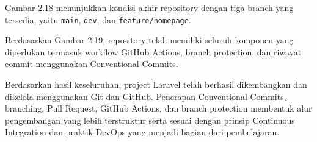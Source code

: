 \documentclass[a4paper,oneside,11pt]{book}
\begin{document}

Gambar 2.18 menunjukkan kondisi akhir repository dengan tiga branch yang tersedia, yaitu \texttt{main}, \texttt{dev}, dan \texttt{feature/homepage}.


Berdasarkan Gambar 2.19, repository telah memiliki seluruh komponen yang diperlukan termasuk workflow GitHub Actions, branch protection, dan riwayat commit menggunakan Conventional Commits.

Berdasarkan hasil keseluruhan, project Laravel telah berhasil dikembangkan dan dikelola menggunakan Git dan GitHub. Penerapan Conventional Commits, branching, Pull Request, GitHub Actions, dan branch protection membentuk alur pengembangan yang lebih terstruktur serta sesuai dengan prinsip Continuous Integration dan praktik DevOps yang menjadi bagian dari pembelajaran.

\clearpage

\end{document}
